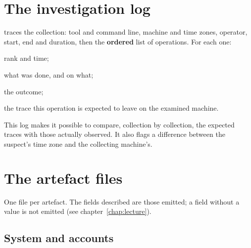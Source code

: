 \documentclass[11pt,a4paper,oneside]{report}
\begin{document}
\section{The investigation log}

 traces the collection: tool and command line,
machine and time zones, operator, start, end and duration, then the
\textbf{ordered} list of operations. For each one:

\begin{description}[style=nextline,leftmargin=1.2em]
  \item[\champ{Seq}, \champ{TimestampUtc}, \champ{TimestampLocal}] rank and time;
  \item[\champ{Operation}, \champ{Target}] what was done, and on what;
  \item[\champ{Result}] the outcome;
  \item[\champ{Footprint}] the trace this operation is expected to leave on the
        examined machine.
\end{description}

This log makes it possible to compare, collection by collection, the expected
traces with those actually observed. It also flags a difference between the
suspect's time zone and the collecting machine's.

\section{The artefact files}

One file per artefact. The fields described are those emitted; a field without
a value is not emitted (see chapter~\ref{chap:lecture}).

\subsection{System and accounts}
\end{document}

